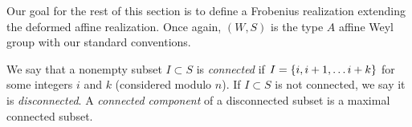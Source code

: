 


Our goal for the rest of this section is to define a Frobenius realization extending the deformed affine realization. Once again, $(W,S)$ is the type $A$ affine Weyl group with our standard conventions.

\begin{defn}
We say that a nonempty subset $I \subset S$ is \emph{connected} if $I=\{i, i+1, \ldots i+k\}$ for some integers $i$ and $k$ (considered modulo $n$). If $I\subset S$ is not connected, we say it is \emph{disconnected}. 
A \emph{connected component} of a disconnected subset is a maximal connected subset.
\end{defn}

